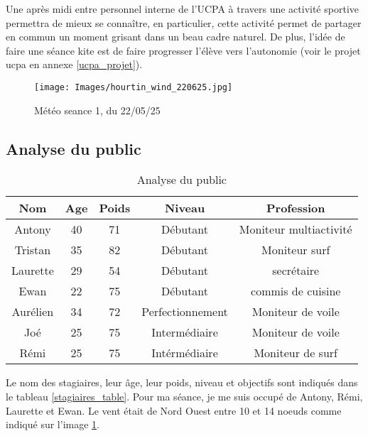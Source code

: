 \documentclass[11pt,a4paper]{report}
\begin{document}
Une après midi entre personnel interne de l'UCPA à travers une 
activité sportive permettra  de mieux se connaître, 
en particulier, cette activité permet de partager en commun
un moment grisant dans un beau cadre naturel. De plus, l'idée
de faire une séance kite est de faire progresser l'élève vers 
l'autonomie (voir le projet ucpa en annexe \ref{ucpa_projet}).


\begin{figure}
\centering
\texttt{[image: Images/hourtin\_wind\_220625.jpg]} 
\caption{Météo seance 1, du 22/05/25\label{meteo}}
\end{figure}

\subsection{Analyse du public}
\begin{table}
\begin{tabular}{|c|c|c|c|c|}
        \hline
        \textbf{Nom}& \textbf{Age} & \textbf{Poids}& \textbf{Niveau}     &  \textbf{Profession} \\ 
        \hline
       Antony      &  40         &  71           &    Débutant          & Moniteur multiactivité  \\
       \hline
        Tristan       &  35          & 82            &  Débutant           & Moniteur surf  \\
        \hline
        Laurette      &  29          & 54            &  Débutant           & secrétaire \\
        \hline
        Ewan          &  22          & 75            & Débutant            & commis de cuisine  \\
        \hline
         Aurélien      &  34          &  72           &   Perfectionnement  & Moniteur de voile \\
         \hline
        Joé           &  25          &  75           &   Intermédiaire     & Moniteur de voile \\
        \hline
        Rémi          &  25          & 75            &  Intérmédiaire           &  Moniteur de surf  \\
        \hline
\end{tabular}
\caption{Analyse du public\label{analyse_public}}
\end{table}
Le nom des stagiaires, leur \^age, leur poids, niveau et objectifs sont
indiqués dans le tableau \ref{stagiaires_table}.
Pour ma séance, je me suis occupé de Antony, Rémi, Laurette et Ewan.
 Le vent était de Nord Ouest entre 
10 et 14 noeuds comme indiqué sur l'image \ref{meteo}.
\end{document}
